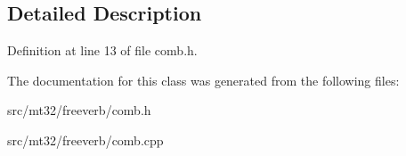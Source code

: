 \subsection{Detailed Description}


Definition at line 13 of file comb.\-h.



The documentation for this class was generated from the following files\-:\begin{DoxyCompactItemize}
\item 
src/mt32/freeverb/comb.\-h\item 
src/mt32/freeverb/comb.\-cpp\end{DoxyCompactItemize}
